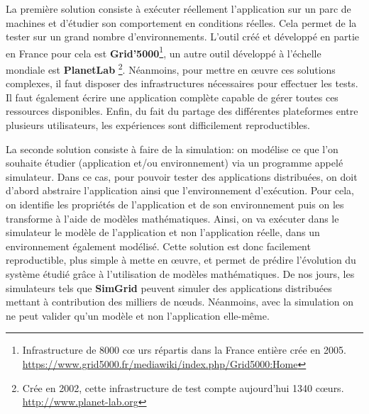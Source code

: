 La première solution consiste à exécuter réellement l'application sur un parc de
machines et d'étudier son comportement en conditions réelles. Cela permet de la
tester sur un grand nombre d'environnements. L'outil créé et développé en partie
en France pour cela est \textbf{Grid'5000}\footnote{Infrastructure de 8000 c\oe
  urs répartis dans la France entière crée en
  2005. \\ \url{https://www.grid5000.fr/mediawiki/index.php/Grid5000:Home}}\citep{GRID5000},
un autre outil développé à l'échelle mondiale est
\textbf{PlanetLab} \footnote{Crée en 2002, cette infrastructure de test compte
  aujourd'hui 1340 c\oe urs. \\ \url{http://www.planet-lab.org}}. Néanmoins,
pour mettre en \oe uvre ces solutions complexes, il faut disposer des
infrastructures nécessaires pour effectuer les tests. Il faut également écrire
une application complète capable de gérer toutes ces ressources
disponibles. Enfin, du fait du partage des différentes plateformes entre
plusieurs utilisateurs, les expériences sont difficilement reproductibles.

La seconde solution consiste à faire de la simulation: on modélise ce que l'on
souhaite étudier (application et/ou environnement) via un programme appelé
simulateur. Dans ce cas, pour pouvoir tester des applications distribuées, on doit d'abord abstraire l'application ainsi que l'environnement
d'exécution. Pour cela, on identifie les propriétés de l'application et de son
environnement puis on les transforme à l'aide de modèles mathématiques. Ainsi,
on va exécuter dans le simulateur le modèle de l'application et non
l'application réelle, dans un environnement également modélisé. Cette solution
est donc facilement reproductible, plus simple à mette en \oe uvre, et permet de
prédire l'évolution du système étudié grâce à l'utilisation de modèles
mathématiques. De nos jours, les simulateurs tels que
\textbf{SimGrid}\citep{CASANOVA:SimGrid, MARTIN:SimGrid} peuvent simuler des
applications distribuées mettant à contribution des milliers de
n\oe uds. Néanmoins, avec la simulation on ne peut valider qu'un modèle et non
l'application elle-même.

